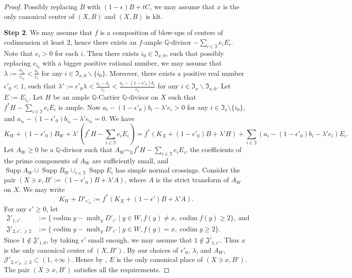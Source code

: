 \documentclass[11pt]{amsart}
\numberwithin{equation}{section}
\newcommand{\Qq}{\mathbb{Q}}
\newcommand{\Supp}{\operatorname{Supp}}
\newcommand{\mult}{\operatorname{mult}}
\newcommand{\codim}{\operatorname{codim}}
\theoremstyle{definition}
\theoremstyle{definition}
\begin{document}
\begin{proof}
Possibly replacing $B$ with $(1-\epsilon)B+tC$, we may assume that $x$ is the only canonical center of $(X,B)$ and $(X,B)$ is klt.

\medskip

\noindent\textbf{Step 2}. We may assume that $f$ is a composition of blow-ups of centers of codimension at least 2, hence there exists an $f$-ample $\Qq$-divisor $-\sum_{i\in \mathfrak{I}} e_iE_i$. Note that $e_i>0$ for each $i$. Then there exists $i_0\in \mathfrak{I}_{x,0}$, such that possibly replacing $e_{i_0}$ with a bigger positive rational number, we may assume that $\lambda:=\frac{a_{i_0}}{e_{i_0}}<\frac{a_i}{e_i}$ for any $i\in \mathfrak{I}_{x,0}\backslash \{i_0\}$. Moreover, there exists a positive real number $\epsilon'_0<1$, such that $\lambda':=\epsilon'_0\lambda<\frac{a_i-b_i}{e_i}<\frac{a_i-(1-\epsilon'_0)b_i}{e_i}$ for any $i\in \mathfrak{I}_x\backslash \mathfrak{I}_{x,0}$. Let $E:=E_{i_0}$. Let $H$ be an ample $\Qq$-Cartier $\Qq$-divisor on $X$ such that $f^*H-\sum_{i\in \mathfrak{I}} e_iE_i$ is ample. Now $a_i-(1-\epsilon'_0)b_i-\lambda' e_i>0$ for any $i\in \mathfrak{I}_x\setminus \{i_0\}$, and $a_{i_0}-(1-\epsilon'_0)b_{i_0}-\lambda' e_{i_0}=0$. We have
$$K_W+(1-\epsilon'_0)B_W+\lambda' (f^{*}H-\sum_{i\in \mathfrak{I}} e_iE_i)=f^{*}(K_X+(1-\epsilon'_0)B+\lambda' H)+\sum_{i\in \mathfrak{I}}(a_i-(1-\epsilon'_0)b_i-\lambda' e_i)E_i.$$
Let $A_W\ge0$ be a $\Qq$-divisor such that $A_W\sim_{\Qq} f^{*}H-\sum_{i\in \mathfrak{I}} e_iE_i$, the coefficients of the prime components of $A_W$ are sufficiently small, and $\Supp A_W\cup \Supp B_W\cup_{i\in \mathfrak{I}} \Supp E_i$ has simple normal crossings. Consider the pair $(X\ni x,B':=(1-\epsilon'_0)B+\lambda' A)$, where $A$ is the strict transform of $A_W$ on $X$. We may write $$K_W+D'_{\epsilon'_0}:=f^{*}(K_X+(1-\epsilon')B+\lambda' A).$$ 
For any $\epsilon'\ge 0$, let
\begin{align*}
    \mathfrak{J}'_{1,\epsilon'}&:=\{\codim y-\mult_y D'_{\epsilon'}\mid y\in W, f(y)\neq x,\codim f(y)\geq 2\},~\text{and}\\
    \mathfrak{J}'_{2,\epsilon',\ge2}&:=\{\codim y-\mult_y D'_{\epsilon'}\mid y\in W, f(y)=x,\codim y\geq 2\}.
\end{align*}
Since $1\notin \mathfrak{J}'_{1,0}$, by taking $\epsilon'$ small enough, we may assume that $1\notin \mathfrak{J}'_{1,\epsilon'}$. Thus $x$ is the only canonical center of $(X,B')$. By our choices of $\epsilon'_0$, $\lambda$, and $A_W$, $\mathcal{J}'_{2,\epsilon'_0,\ge2}\subset (1,+\infty)$. Hence by \cite[Lemma~3.3]{CH21}, $E$ is the only canonical place of $(X\ni x,B')$. The pair $(X\ni x, B')$ satisfies all the requirements.
\end{proof}
\end{document}
